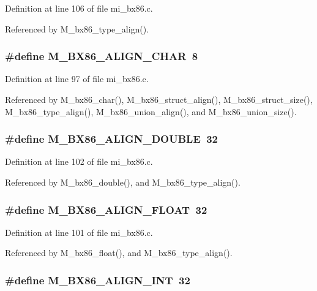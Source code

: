 Definition at line 106 of file mi\_\-bx86.c.

Referenced by M\_\-bx86\_\-type\_\-align().
\subsubsection{\setlength{\rightskip}{0pt plus 5cm}\#define M\_\-BX86\_\-ALIGN\_\-CHAR~8}\label{mi__bx86_8c_d3e21981d9616c391bbf4cad69ae24bb}




Definition at line 97 of file mi\_\-bx86.c.

Referenced by M\_\-bx86\_\-char(), M\_\-bx86\_\-struct\_\-align(), M\_\-bx86\_\-struct\_\-size(), M\_\-bx86\_\-type\_\-align(), M\_\-bx86\_\-union\_\-align(), and M\_\-bx86\_\-union\_\-size().
\subsubsection{\setlength{\rightskip}{0pt plus 5cm}\#define M\_\-BX86\_\-ALIGN\_\-DOUBLE~32}\label{mi__bx86_8c_57e5ee51b12739430b42a51130807886}




Definition at line 102 of file mi\_\-bx86.c.

Referenced by M\_\-bx86\_\-double(), and M\_\-bx86\_\-type\_\-align().
\subsubsection{\setlength{\rightskip}{0pt plus 5cm}\#define M\_\-BX86\_\-ALIGN\_\-FLOAT~32}\label{mi__bx86_8c_69d41f23fc1e2a42c78fc6dd6497a788}




Definition at line 101 of file mi\_\-bx86.c.

Referenced by M\_\-bx86\_\-float(), and M\_\-bx86\_\-type\_\-align().
\subsubsection{\setlength{\rightskip}{0pt plus 5cm}\#define M\_\-BX86\_\-ALIGN\_\-INT~32}\label{mi__bx86_8c_cb1e5bc838b5f1f14da055912ed56159}




